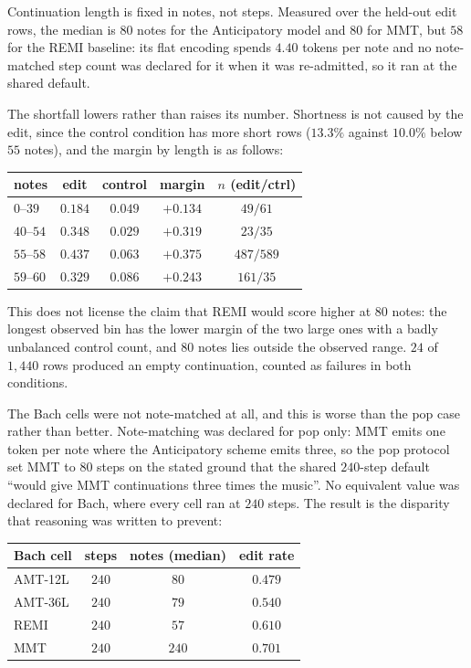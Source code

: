 \documentclass{article}
\begin{document}
Continuation length is fixed in notes, not steps. Measured over the held-out edit rows,
the median is $80$ notes for the Anticipatory model and $80$ for MMT, but $58$ for the
REMI baseline: its flat encoding spends $4.40$ tokens per note and no note-matched step
count was declared for it when it was re-admitted, so it ran at the shared default.

The shortfall lowers rather than raises its number. Shortness is not caused by the edit,
since the control condition has more short rows ($13.3\%$ against $10.0\%$ below $55$
notes), and the margin by length is as follows:

\begin{center}\footnotesize
\begin{tabular}{@{}lcccc@{}}
\toprule
notes & edit & control & margin & $n$ (edit/ctrl)\\
\midrule
$0$--$39$  & $0.184$ & $0.049$ & $+0.134$ & $49/61$\\
$40$--$54$ & $0.348$ & $0.029$ & $+0.319$ & $23/35$\\
$55$--$58$ & $0.437$ & $0.063$ & $+0.375$ & $487/589$\\
$59$--$60$ & $0.329$ & $0.086$ & $+0.243$ & $161/35$\\
\bottomrule
\end{tabular}
\end{center}

This does not license the claim that REMI would score higher at $80$ notes: the longest
observed bin has the lower margin of the two large ones with a badly unbalanced control
count, and $80$ notes lies outside the observed range. $24$ of $1{,}440$ rows produced
an empty continuation, counted as failures in both conditions.

The Bach cells were not note-matched at all, and this is worse than the pop case rather
than better. Note-matching was declared for pop only: MMT emits one token per note where
the Anticipatory scheme emits three, so the pop protocol set MMT to $80$ steps on the
stated ground that the shared $240$-step default ``would give MMT continuations three
times the music''. No equivalent value was declared for Bach, where every cell ran at
$240$ steps. The result is the disparity that reasoning was written to prevent:

\begin{center}\footnotesize
\begin{tabular}{@{}lccc@{}}
\toprule
Bach cell & steps & notes (median) & edit rate\\
\midrule
AMT-12L & $240$ & $80$  & $0.479$\\
AMT-36L & $240$ & $79$  & $0.540$\\
REMI    & $240$ & $57$  & $0.610$\\
MMT     & $240$ & $240$ & $0.701$\\
\bottomrule
\end{tabular}
\end{center}
\end{document}
